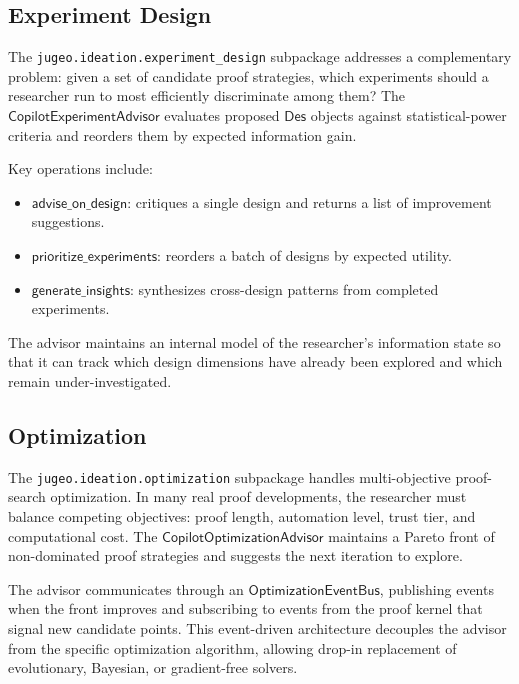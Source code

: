 \documentclass[11pt]{article}
\newcommand{\Design}{\mathsf{Des}}
\begin{document}
\subsection{Experiment Design}\label{sec:ideation-experiment}

The \texttt{jugeo.ideation.experiment\_design} subpackage
addresses a complementary problem: given a set of candidate
proof strategies, which experiments should a researcher run to
most efficiently discriminate among them?  The
$\mathsf{CopilotExperimentAdvisor}$ evaluates proposed
$\Design$ objects against statistical-power criteria and
reorders them by expected information gain.

Key operations include:
\begin{itemize}
  \item $\mathsf{advise\_on\_design}$: critiques a single design
        and returns a list of improvement suggestions.
  \item $\mathsf{prioritize\_experiments}$: reorders a batch of
        designs by expected utility.
  \item $\mathsf{generate\_insights}$: synthesizes cross-design
        patterns from completed experiments.
\end{itemize}

The advisor maintains an internal model of the researcher's
information state so that it can track which design dimensions
have already been explored and which remain under-investigated.

\subsection{Optimization}\label{sec:ideation-optimization}

The \texttt{jugeo.ideation.optimization} subpackage handles
multi-objective proof-search optimization.  In many real proof
developments, the researcher must balance competing objectives:
proof length, automation level, trust tier, and computational
cost.  The $\mathsf{CopilotOptimizationAdvisor}$ maintains a
Pareto front of non-dominated proof strategies and suggests the
next iteration to explore.

The advisor communicates through an
$\mathsf{OptimizationEventBus}$, publishing events when the
front improves and subscribing to events from the proof kernel
that signal new candidate points.  This event-driven architecture
decouples the advisor from the specific optimization algorithm,
allowing drop-in replacement of evolutionary, Bayesian, or
gradient-free solvers.
\end{document}
